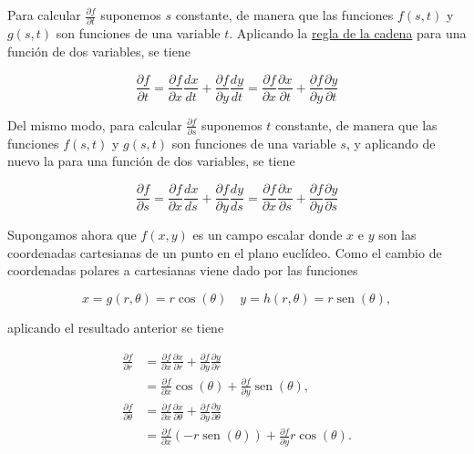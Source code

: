 \documentclass[
  a4paper,
]{scrreport}
\theoremstyle{definition}
\theoremstyle{remark}
\begin{document}
\begin{tcolorbox}[enhanced jigsaw, rightrule=.15mm, opacityback=0, bottomtitle=1mm, titlerule=0mm, toprule=.15mm, breakable, colframe=quarto-callout-tip-color-frame, left=2mm, opacitybacktitle=0.6, title=\textcolor{quarto-callout-tip-color}{\faLightbulb}\hspace{0.5em}{Solución}, toptitle=1mm, colback=white, colbacktitle=quarto-callout-tip-color!10!white, arc=.35mm, bottomrule=.15mm, coltitle=black, leftrule=.75mm]

Para calcular \(\frac{\partial f}{\partial t}\) suponemos \(s\)
constante, de manera que las funciones \(f(s,t)\) y \(g(s,t)\) son
funciones de una variable \(t\). Aplicando la
\href{https://aprendeconalf.es/analisis-manual/13-derivadas-funciones-varias-variables.html\#regla-de-la-cadena}{regla
de la cadena} para una función de dos variables, se tiene

\[
\frac{\partial f}{\partial t} 
= \frac{\partial f}{\partial x}\frac{dx}{dt} + \frac{\partial f}{\partial y}\frac{dy}{dt} 
= \frac{\partial f}{\partial x}\frac{\partial x}{\partial t} + \frac{\partial f}{\partial y}\frac{\partial y}{\partial t}
\]

Del mismo modo, para calcular \(\frac{\partial f}{\partial s}\)
suponemos \(t\) constante, de manera que las funciones \(f(s,t)\) y
\(g(s,t)\) son funciones de una variable \(s\), y aplicando de nuevo la
para una función de dos variables, se tiene

\[
\frac{\partial f}{\partial s} 
= \frac{\partial f}{\partial x}\frac{dx}{ds} + \frac{\partial f}{\partial y}\frac{dy}{ds} 
= \frac{\partial f}{\partial x}\frac{\partial x}{\partial s} + \frac{\partial f}{\partial y}\frac{\partial y}{\partial s}
\]

Supongamos ahora que \(f(x,y)\) es un campo escalar donde \(x\) e \(y\)
son las coordenadas cartesianas de un punto en el plano euclídeo. Como
el cambio de coordenadas polares a cartesianas viene dado por las
funciones

\[
x = g(r,\theta) = r\cos(\theta) \quad y = h(r,\theta) = r\operatorname{sen}(\theta),
\]

aplicando el resultado anterior se tiene

\begin{align*}
\frac{\partial f}{\partial r} 
&= \frac{\partial f}{\partial x}\frac{\partial x}{\partial r} + \frac{\partial f}{\partial y}\frac{\partial y}{\partial r} \\
&= \frac{\partial f}{\partial x}\cos(\theta) + \frac{\partial f}{\partial y}\operatorname{sen}(\theta), \\
\frac{\partial f}{\partial \theta} 
&= \frac{\partial f}{\partial x}\frac{\partial x}{\partial \theta} + \frac{\partial f}{\partial y}\frac{\partial y}{\partial \theta} \\
&= \frac{\partial f}{\partial x}(-r\operatorname{sen}(\theta)) + \frac{\partial f}{\partial y}r\cos(\theta).
\end{align*}

\end{tcolorbox}
\end{document}

